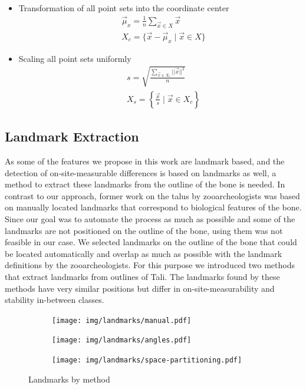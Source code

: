 \documentclass[pdftex,12pt,a4paper]{report}
\begin{document}
\begin{itemize}
	\item Transformation of all point sets into the coordinate center
	\begin{equation}
		\begin{split}
			& \vec{\mu}_x = \frac{1}{n} \sum_{\vec{x} \in X} \vec{x} \\
			& X_c = \{ \vec{x} - \vec{\mu}_x \mid \vec{x} \in X \}
		\end{split} 
	\end{equation}
	\item Scaling all point sets uniformly
	\begin{equation}
		\begin{split}
			& s = \sqrt{\frac{\sum\limits_{\vec{x} \in X_c}||\vec{x}||^2}{n}} \\
			& X_s = \left\{ \frac{\vec{x}}{s} \mid \vec{x} \in X_c \right\}
		\end{split}
	\end{equation}
\end{itemize}

\subsection{Landmark Extraction}
\label{sub:landmarks}

As some of the features we propose in this work are landmark based, and the detection of on-site-measurable differences
is based on landmarks as well, a method to extract these landmarks from the outline of the bone is needed. In contrast to
our approach, former work on the talus by zooarcheologists was based on manually located landmarks that correspond to
biological features of the bone. Since our goal was to automate the process as much as possible and some of the landmarks
are not positioned on the outline of the bone, using them was not feasible in our case. We selected landmarks on the outline
of the bone that could be located automatically and overlap as much as possible with the landmark definitions by the
zooarcheologists. For this purpose we introduced two methods that extract landmarks from outlines of Tali. The landmarks
found by these methods have very similar positions but differ in on-site-measurability and stability in-between classes.

\begin{figure}[h]
	\centering
	\begin{subfigure}[b]{0.3\textwidth}
		\centering
		\texttt{[image: img/landmarks/manual.pdf]}
	\end{subfigure}
	\begin{subfigure}[b]{0.3\textwidth}
		\centering
		\texttt{[image: img/landmarks/angles.pdf]}
	\end{subfigure}
	\begin{subfigure}[b]{0.3\textwidth}
		\centering
		\texttt{[image: img/landmarks/space-partitioning.pdf]}
	\end{subfigure}
	\caption{Landmarks by method}
	\label{fig:landmark-methods}
\end{figure}
\end{document}
